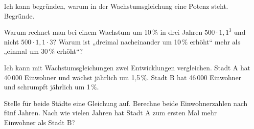 \begin{aufgabe}{Ich kann begründen, warum in der Wachstumsgleichung eine Potenz steht.}
Begründe.
\begin{teile}
\teil Warum rechnet man bei einem Wachstum um 10\,\% in drei Jahren $500 \cdot 1{,}1^3$ und nicht $500 \cdot 1{,}1 \cdot 3$?
\teil Warum ist „dreimal nacheinander um 10\,\% erhöht“ mehr als „einmal um 30\,\% erhöht“?
\end{teile}
\end{aufgabe}

\begin{aufgabe}{Ich kann mit Wachstumsgleichungen zwei Entwicklungen vergleichen.}
Stadt A hat 40\,000 Einwohner und wächst jährlich um 1,5\,\%. Stadt B hat 46\,000 Einwohner und schrumpft jährlich um 1\,\%.
\begin{teile}
\teil Stelle für beide Städte eine Gleichung auf.
\teil Berechne beide Einwohnerzahlen nach fünf Jahren.
\teil Nach wie vielen Jahren hat Stadt A zum ersten Mal mehr Einwohner als Stadt B?
\end{teile}
\end{aufgabe}
